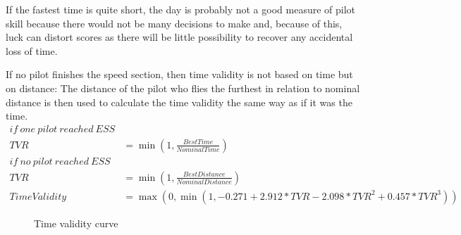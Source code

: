 \documentclass{article}
\begin{document}
If the fastest time is quite short, the day is probably not a good measure of
pilot skill because there would not be many decisions to make and, because of
this, luck can distort scores as there will be little possibility to recover
any accidental loss of time.

If no pilot finishes the speed section, then time validity is not based on time
but on distance: The distance of the pilot who flies the furthest in relation
to nominal distance is then used to calculate the time validity the same way as
if it was the time.
\begin{align*}
    if \ one \ pilot \ reached \ ESS \\
    TVR &= \min(1, \frac{BestTime}{NominalTime}) \\
    if \ no \ pilot \ reached \ ESS \\
    TVR &= \min(1, \frac{BestDistance}{NominalDistance}) \\
    TimeValidity &= \max(0, \min(1, -0.271 + 2.912 * TVR - 2.098 * TVR^2 + 0.457 * TVR^3))
\end{align*}

\begin{figure}[h!]
    
    \caption{Time validity curve}
\end{figure}

\newpage
\end{document}
